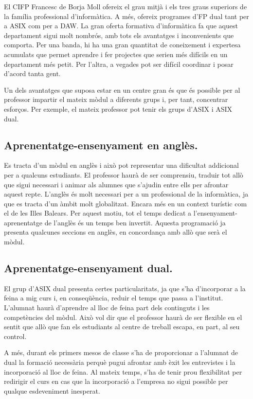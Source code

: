 \documentclass[catalan, a4paper, 12pt, titlepage]{article}
\begin{document}
El CIFP Francesc de Borja Moll ofereix el grau mitjà i els tres graus superiors de la família professional d'informàtica. 
A més, ofereix programes d'FP dual tant per a ASIX com per a DAW.
La gran oferta formativa d'informàtica fa que aquest departament sigui molt nombrós, amb tots els avantatges i inconvenients que comporta.
Per una banda, hi ha una gran quantitat de coneixement i expertesa acumulats que permet aprendre i fer projectes que serien més difícils en un departament més petit.
Per l'altra, a vegades pot ser difícil coordinar i posar d'acord tanta gent.

Un dels avantatges que suposa estar en un centre gran és que és possible per al professor impartir el mateix mòdul a diferents grups i, per tant, concentrar esforços.
Per exemple, el mateix professor pot tenir els grups d'ASIX i ASIX dual.

\subsection{Aprenentatge-ensenyament en anglès.}

Es tracta d'un mòdul en anglès i això pot representar una dificultat addicional per a qualcuns estudiants.
El professor haurà de ser comprensiu, traduir tot allò que sigui necessari i animar als alumnes que s'ajudin entre ells per afrontar aquest repte.
L'anglès és molt necessari per a un professional de la informàtica, ja que es tracta d'un àmbit molt globalitzat.
Encara més en un context turístic com el de les Illes Balears.
Per aquest motiu, tot el temps dedicat a l'ensenyament-aprenentatge de l'anglès és un temps ben invertit.
Aquesta programació ja presenta qualcunes seccions en anglès, en concordança amb allò que serà el mòdul.

\subsection{Aprenentatge-ensenyament dual.}

El grup d'ASIX dual presenta certes particularitats, ja que s'ha d'incorporar a la feina a mig curs i, en conseqüència, reduir el temps que passa a l'institut.
L'alumnat haurà d'aprendre al lloc de feina part dels continguts i les competències del mòdul.
Això vol dir que el professor haurà de ser flexible en el sentit que allò que fan els estudiants al centre de treball escapa, en part, al seu control.

A més, durant els primers mesos de classe s'ha de proporcionar a l'alumnat de dual la formació necessària perquè pugui afrontar amb èxit les entrevistes i la incorporació al lloc de feina.
Al mateix temps, s'ha de tenir prou flexibilitat per redirigir el curs en cas que la incorporació a l'empresa no sigui possible per qualque esdeveniment inesperat.
\end{document}
